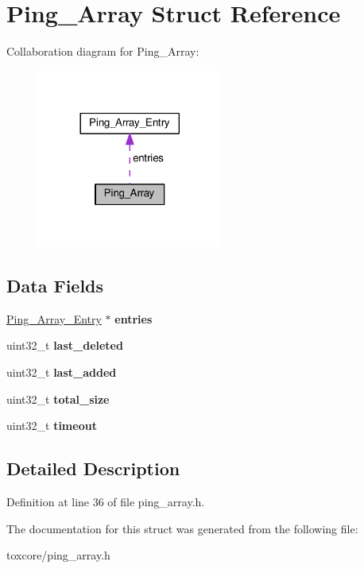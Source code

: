 \hypertarget{struct_ping___array}{\section{Ping\+\_\+\+Array Struct Reference}
\label{struct_ping___array}
}


Collaboration diagram for Ping\+\_\+\+Array\+:
\nopagebreak
\begin{figure}[H]
\begin{center}
\leavevmode
\includegraphics[width=173pt]{struct_ping___array__coll__graph}
\end{center}
\end{figure}
\subsection*{Data Fields}
\begin{DoxyCompactItemize}
\item 
\hypertarget{struct_ping___array_a313b705ae8f0db8c02b2847b315ca1b1}{\hyperlink{struct_ping___array___entry}{Ping\+\_\+\+Array\+\_\+\+Entry} $\ast$ {\bfseries entries}}\label{struct_ping___array_a313b705ae8f0db8c02b2847b315ca1b1}

\item 
\hypertarget{struct_ping___array_ab3011676335a878a2c94492a37a63c3f}{uint32\+\_\+t {\bfseries last\+\_\+deleted}}\label{struct_ping___array_ab3011676335a878a2c94492a37a63c3f}

\item 
\hypertarget{struct_ping___array_a812ff28187c193e9a813628c36257df8}{uint32\+\_\+t {\bfseries last\+\_\+added}}\label{struct_ping___array_a812ff28187c193e9a813628c36257df8}

\item 
\hypertarget{struct_ping___array_acdfd526bb392e1ee59a3c6c545891b48}{uint32\+\_\+t {\bfseries total\+\_\+size}}\label{struct_ping___array_acdfd526bb392e1ee59a3c6c545891b48}

\item 
\hypertarget{struct_ping___array_ab5627d8d8b095c198e2523c44ca380ac}{uint32\+\_\+t {\bfseries timeout}}\label{struct_ping___array_ab5627d8d8b095c198e2523c44ca380ac}

\end{DoxyCompactItemize}


\subsection{Detailed Description}


Definition at line 36 of file ping\+\_\+array.\+h.



The documentation for this struct was generated from the following file\+:\begin{DoxyCompactItemize}
\item 
toxcore/ping\+\_\+array.\+h\end{DoxyCompactItemize}
